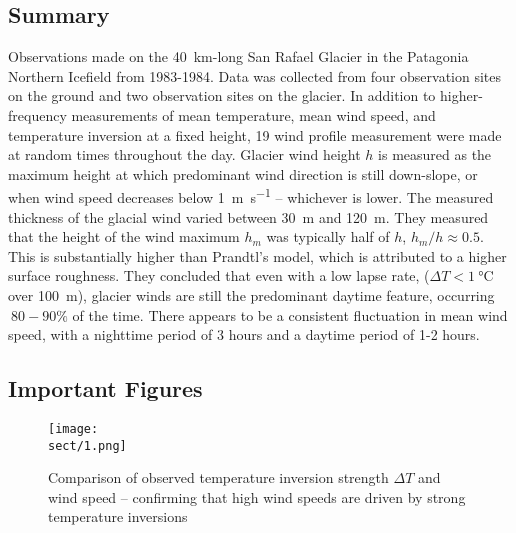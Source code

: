 \documentclass{article}
\begin{document}
\subsection*{Summary}
Observations made on the 40~km-long San Rafael Glacier in the Patagonia Northern Icefield from 1983-1984. Data was collected from four observation sites on the ground and two observation sites on the glacier. In addition to higher-frequency measurements of mean temperature, mean wind speed, and temperature inversion at a fixed height, 19 wind profile measurement were made at random times throughout the day. Glacier wind height \(h\) is measured as the maximum height at which predominant wind direction is still down-slope, or when wind speed decreases below \SI{1}{\m\per\s} -- whichever is lower. The measured thickness of the glacial wind varied between \SI{30}{\m} and \SI{120}{\m}. They measured that the height of the wind maximum \(h_m\) was typically half of \(h\), \(h_m/h\approx0.5\). This is substantially higher than Prandtl's model, which is attributed to a higher surface roughness. They concluded that even with a low lapse rate, (\(\Delta T<\SI{1}{\celsius}\) over \SI{100}{\m}), glacier winds are still the predominant daytime feature, occurring \(~80-90\%\) of the time. There appears to be a consistent fluctuation in mean wind speed, with a nighttime period of 3 hours and a daytime period of 1-2 hours.
\subsection*{Important Figures}
\begin{figure}[ht]
    \centering
    \vspace{-4mm}
    \texttt{[image: \\sect/1.png]}
    \vspace{-4mm}
    \caption{Comparison of observed temperature inversion strength \(\Delta T\) and wind speed -- confirming that high wind speeds are driven by strong temperature inversions}
    \label{f:down}
\end{figure}
\end{document}
